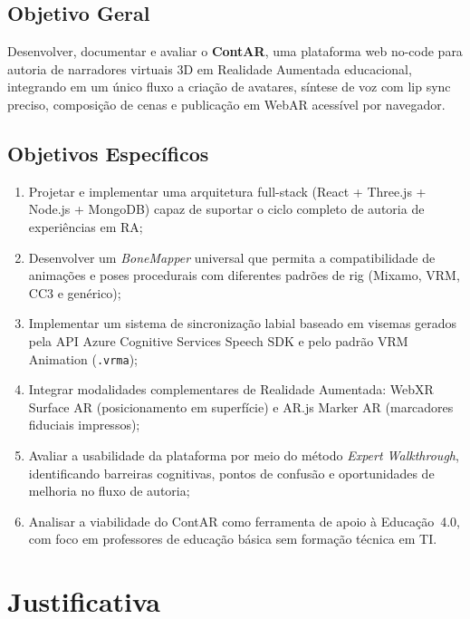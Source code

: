 \documentclass[
  12pt,
  openright,
  twoside,
  a4paper,
  english,
  brazil
]{abntex2}
\begin{document}
\subsection{Objetivo Geral}
\label{subsec:obj-geral}

Desenvolver, documentar e avaliar o \textbf{ContAR}, uma plataforma web
no-code para autoria de narradores virtuais 3D em Realidade Aumentada
educacional, integrando em um único fluxo a criação de avatares, síntese
de voz com lip sync preciso, composição de cenas e publicação em WebAR
acessível por navegador.

\subsection{Objetivos Específicos}
\label{subsec:obj-especificos}

\begin{enumerate}
  \item Projetar e implementar uma arquitetura full-stack (React + Three.js
        + Node.js + MongoDB) capaz de suportar o ciclo completo de autoria
        de experiências em RA;
  \item Desenvolver um \textit{BoneMapper} universal que permita a
        compatibilidade de animações e poses procedurais com diferentes
        padrões de rig (Mixamo, VRM, CC3 e genérico);
  \item Implementar um sistema de sincronização labial baseado em visemas
        gerados pela API Azure Cognitive Services Speech SDK e pelo padrão
        VRM Animation (\texttt{.vrma});
  \item Integrar modalidades complementares de Realidade Aumentada:
        WebXR Surface AR (posicionamento em superfície) e AR.js Marker AR
        (marcadores fiduciais impressos);
  \item Avaliar a usabilidade da plataforma por meio do método
        \textit{Expert Walkthrough}, identificando barreiras cognitivas,
        pontos de confusão e oportunidades de melhoria no fluxo de autoria;
  \item Analisar a viabilidade do ContAR como ferramenta de apoio à
        Educação~4.0, com foco em professores de educação básica sem
        formação técnica em TI.
\end{enumerate}

\section{Justificativa}
\label{sec:justificativa}
\end{document}
